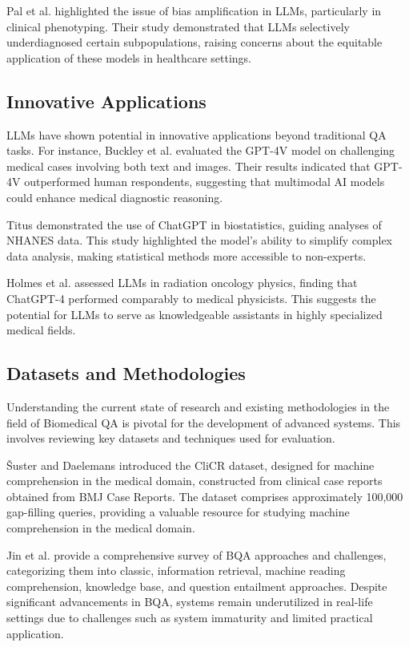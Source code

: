 \documentclass[onecolumn, conference]{IEEEtran}
\begin{document}
Pal et al. \cite{Pal2023} highlighted the issue of bias amplification in LLMs, particularly in clinical phenotyping. Their study demonstrated that LLMs selectively underdiagnosed certain subpopulations, raising concerns about the equitable application of these models in healthcare settings.

\subsection{Innovative Applications}
LLMs have shown potential in innovative applications beyond traditional QA tasks. For instance, Buckley et al. \cite{Buckley2023} evaluated the GPT-4V model on challenging medical cases involving both text and images. Their results indicated that GPT-4V outperformed human respondents, suggesting that multimodal AI models could enhance medical diagnostic reasoning.

Titus \cite{Titus2023} demonstrated the use of ChatGPT in biostatistics, guiding analyses of NHANES data. This study highlighted the model's ability to simplify complex data analysis, making statistical methods more accessible to non-experts.

Holmes et al. \cite{Holmes2023a, Holmes2023b, Holmes2023c} assessed LLMs in radiation oncology physics, finding that ChatGPT-4 performed comparably to medical physicists. This suggests the potential for LLMs to serve as knowledgeable assistants in highly specialized medical fields.

\subsection{Datasets and Methodologies}
Understanding the current state of research and existing methodologies in the field of Biomedical QA is pivotal for the development of advanced systems. This involves reviewing key datasets and techniques used for evaluation.

Šuster and Daelemans \cite{Suster2018} introduced the CliCR dataset, designed for machine comprehension in the medical domain, constructed from clinical case reports obtained from BMJ Case Reports. The dataset comprises approximately 100,000 gap-filling queries, providing a valuable resource for studying machine comprehension in the medical domain.

Jin et al. \cite{Jin2021} provide a comprehensive survey of BQA approaches and challenges, categorizing them into classic, information retrieval, machine reading comprehension, knowledge base, and question entailment approaches. Despite significant advancements in BQA, systems remain underutilized in real-life settings due to challenges such as system immaturity and limited practical application.
\end{document}
